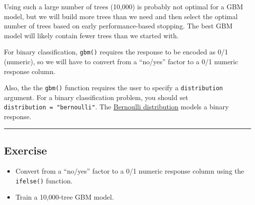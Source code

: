 \documentclass[
]{book}
\newenvironment{Shaded}{\begin{snugshade}}{\end{snugshade}}
\newcommand{\CommentTok}[1]{\textcolor[rgb]{0.56,0.35,0.01}{\textit{#1}}}
\newcommand{\DecValTok}[1]{\textcolor[rgb]{0.00,0.00,0.81}{#1}}
\newcommand{\KeywordTok}[1]{\textcolor[rgb]{0.13,0.29,0.53}{\textbf{#1}}}
\newcommand{\NormalTok}[1]{#1}
\newcommand{\OperatorTok}[1]{\textcolor[rgb]{0.81,0.36,0.00}{\textbf{#1}}}
\newcommand{\StringTok}[1]{\textcolor[rgb]{0.31,0.60,0.02}{#1}}
\providecommand{\tightlist}{%
  \setlength{\itemsep}{0pt}\setlength{\parskip}{0pt}}
\begin{document}
Using such a large number of trees (10,000) is probably not optimal for a GBM model, but we will build more trees than we need and then select the optimal number of trees based on early performance-based stopping. The best GBM model will likely contain fewer trees than we started with.

For binary classification, \texttt{gbm()} requires the response to be encoded as 0/1 (numeric), so we will have to convert from a ``no/yes'' factor to a 0/1 numeric response column.

Also, the the \texttt{gbm()} function requires the user to specify a \texttt{distribution} argument. For a binary classification problem, you should set \texttt{distribution\ =\ "bernoulli"}. The \href{https://en.wikipedia.org/wiki/Bernoulli_distribution}{Bernoulli distribution} models a binary response.

\begin{center}\rule{0.5\linewidth}{0.5pt}\end{center}

\hypertarget{exercise-22}{%
\subsection*{Exercise}\label{exercise-22}}

\begin{itemize}
\tightlist
\item
  Convert from a ``no/yes'' factor to a 0/1 numeric response column using the \texttt{ifelse()} function.
\end{itemize}

\begin{Shaded}
\end{Shaded}

\begin{itemize}
\tightlist
\item
  Train a 10,000-tree GBM model.
\end{itemize}
\end{document}
